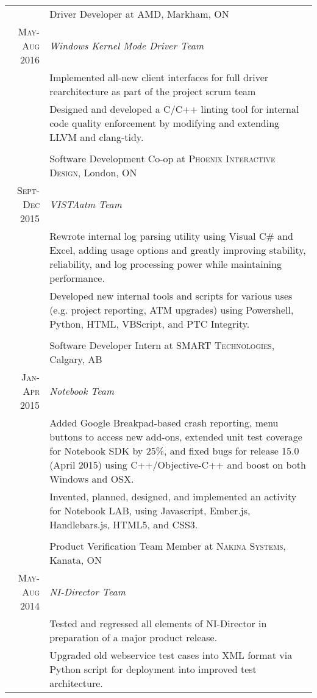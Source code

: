\documentclass[a4paper,10pt]{article}
\begin{document}
\begin{tabular}{r|p{15.4cm}}
& Driver Developer at \textsc{AMD}, Markham, ON \\ \textsc{May-Aug 2016} & \emph{Windows Kernel Mode Driver Team}\\
&\footnotesize{Implemented all-new client interfaces for full driver rearchitecture as part of the project scrum team}\\
&\footnotesize{Designed and developed a C\slash C++ linting tool for internal code quality enforcement by modifying and extending LLVM and clang-tidy.}\\

\multicolumn{2}{c}{} \\
& Software Development Co-op at \textsc{Phoenix Interactive Design}, London, ON\\
\textsc{Sept-Dec 2015} & \emph{VISTAatm Team}\\
&\footnotesize{Rewrote internal log parsing utility using Visual C\# and Excel, adding usage options and greatly improving stability, reliability, and log processing power while maintaining performance.}\\
&\footnotesize{Developed new internal tools and scripts for various uses (e.g. project reporting, ATM upgrades) using Powershell, Python, HTML, VBScript, and PTC Integrity.}\\

\multicolumn{2}{c}{}\\
& Software Developer Intern at \textsc{SMART Technologies}, Calgary, AB \\
\textsc{Jan-Apr 2015}&\emph{Notebook Team}\\
&\footnotesize{
Added Google Breakpad-based crash reporting, menu buttons to access new add-ons, extended unit test coverage for Notebook SDK by 25\%, and fixed bugs for release 15.0 (April 2015) using C++/Objective-C++ and boost on both Windows and OSX.}\\
&\footnotesize{Invented, planned, designed, and implemented an activity for Notebook LAB, using Javascript, Ember.js, Handlebars.js, HTML5, and CSS3.
}\\

\multicolumn{2}{c}{} \\
& Product Verification Team Member at \textsc{Nakina Systems}, Kanata, ON \\
\textsc{May-Aug 2014} & \emph{NI-Director Team}\\
&\footnotesize{Tested and regressed all elements of NI-Director in preparation of a major product release.}\\
&\footnotesize{Upgraded old webservice test cases into XML format via Python script for deployment into improved test architecture.}\\
 
\end{tabular}
\end{document}
